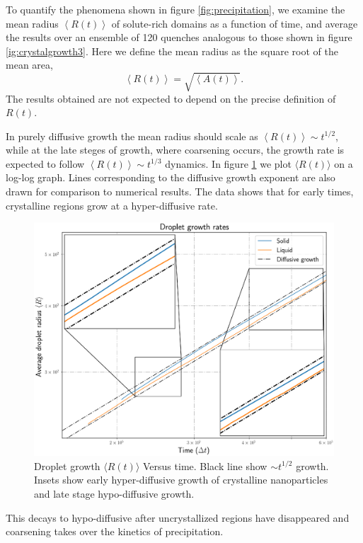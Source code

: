 \documentclass[showkeys, prb, reprint]{revtex4-1}
\newcommand{\mean}[1]{\left\langle #1 \right\rangle}
\begin{document}
%
To quantify the phenomena shown in figure \ref{fig:precipitation}, we examine
the mean radius $\mean{R(t)}$ of solute-rich domains as a function of time, and
average the results over an ensemble of 120 quenches analogous to those shown in 
figure \ref{ig:crystalgrowth3}. Here we define the mean
radius as the square root of the mean area,
%
\begin{equation}
    \mean{R(t)} = \sqrt{\mean{A(t)}}.
\end{equation}
%
The results obtained are not expected to depend on the precise definition of
$R(t)$.

In purely diffusive growth the mean radius should scale as $\mean{R(t)} \sim
t^{1/2}$, while at the late steges of growth, where coarsening occurs, the
growth rate is expected to follow  $\mean{R(t)} \sim t^{1/3}$ dynamics.  In
figure \ref{fig:scaling} we plot $\langle R(t)\rangle$ on a log-log graph.
Lines corresponding to the diffusive growth exponent are also drawn for
comparison to numerical results. The data shows that for early times,
crystalline regions grow at a hyper-diffusive rate. 
%
\begin{figure}
    \centering
    \includegraphics[width=\columnwidth]{scaling}
    \caption{
        \label{fig:scaling}
        Droplet growth $\langle R(t) \rangle$ Versus time. Black line show
        $\sim t^{1/2}$ growth. Insets show early hyper-diffusive growth
        of crystalline nanoparticles and late stage hypo-diffusive growth.
    }
\end{figure}
%
\noindent This decays to hypo-diffusive after uncrystallized regions have disappeared and
coarsening takes over the kinetics of precipitation.
\end{document}
